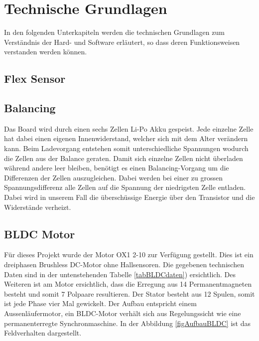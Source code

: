 

\section{Technische Grundlagen}
In den folgenden Unterkapiteln werden die technischen Grundlagen zum Verständnis der Hard- und Software erläutert, so dass deren Funktionsweisen verstanden werden können.  
\subsection{Flex Sensor}
\label{tGl_FlexSensor}

\subsection{Balancing}
\label{tGl_Balancing}
Das Board wird durch einen sechs Zellen Li-Po Akku gespeist. Jede einzelne Zelle hat dabei einen eigenen Innenwiderstand, welcher sich mit dem Alter verändern kann. Beim Ladevorgang entstehen somit unterschiedliche Spannungen wodurch die Zellen aus der Balance geraten.
Damit sich einzelne Zellen nicht überladen während andere leer bleiben, benötigt es einen Balancing-Vorgang um die Differenzen der Zellen auszugleichen. 
Dabei werden bei einer zu grossen Spannungsdifferenz alle Zellen auf die Spannung der niedrigsten Zelle entladen. Dabei wird in unserem Fall die überschüssige Energie über den Transistor und die Widerstände verheizt.

\subsection{BLDC Motor}
\label{tGl_BLDC}

Für dieses Projekt wurde der Motor OX1 2-10 zur Verfügung gestellt. Dies ist ein dreiphasen Brushless DC-Motor ohne Hallsensoren. Die gegebenen technischen Daten sind in der untenstehenden Tabelle \ref{tabBLDCdaten}) ersichtlich. 
Des Weiteren ist am Motor ersichtlich, dass die Erregung aus 14 Permanentmagneten besteht und somit 7 Polpaare resultieren. Der Stator besteht aus 12 Spulen, somit ist jede Phase vier Mal gewickelt.
Der Aufbau entspricht einem Aussenläufermotor, ein BLDC-Motor verhält sich aus Regelungssicht wie eine permanenterregte Synchronmaschine. In der Abbildung \ref{figAufbauBLDC} ist das Feldverhalten dargestellt.\\

